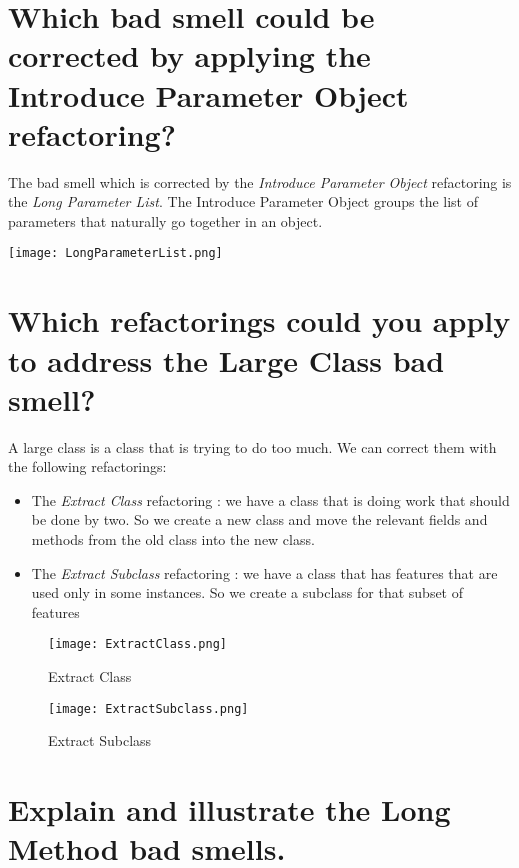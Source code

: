 \section{Which bad smell could be corrected by applying the Introduce Parameter Object
refactoring?}

The bad smell which is corrected by the \textit{Introduce Parameter Object} refactoring is the \textit{Long Parameter List}. The Introduce Parameter Object groups the list of parameters  that naturally go together in an object.

\begin{center}
\texttt{[image: LongParameterList.png]}
\end{center}

\section{Which refactorings could you apply to address the Large Class bad smell?}

A large class is a class that is trying to do too much.  We can correct them with the following refactorings:

\begin{itemize}
\item  The \textit{Extract Class} refactoring : we have a class that is doing work that should be done by two. So we create a new class and move the relevant fields and methods from the old class into the new class.
\item The \textit{Extract Subclass} refactoring : we have a class that has features that are used only in some instances. So we create a subclass for that subset of features
\end{itemize}

\begin{figure}[!ht]
  \centering
  \begin{minipage}[b]{0.4\textwidth}
    \texttt{[image: ExtractClass.png]}
    \caption{Extract Class}
  \end{minipage}
  \hfill
  \begin{minipage}[b]{0.4\textwidth}
    \texttt{[image: ExtractSubclass.png]}
    \caption{Extract Subclass}
  \end{minipage}
\end{figure}

\section{Explain and illustrate the Long Method bad smells.}

